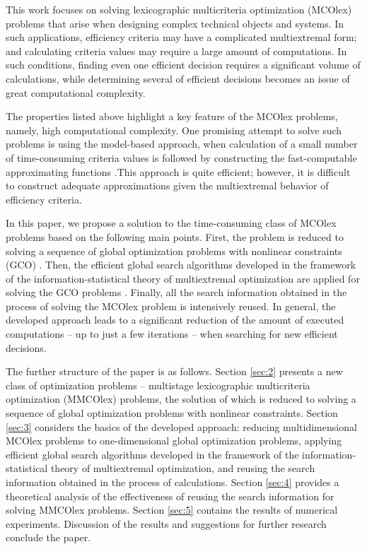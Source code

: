 \documentclass[smallextended]{svjour3}       %
\begin{document}
This work focuses on solving lexicographic multicriteria optimization (MCOlex) problems that arise when designing complex technical objects and systems. In such applications, efficiency criteria may have a complicated multiextremal form; and calculating criteria values may require a large amount of computations. In such conditions, finding even one efficient decision requires a significant volume of calculations, while determining several  of efficient decisions becomes an issue of great computational complexity.

The properties listed above highlight a key feature of the MCOlex problems, namely, high computational complexity. One promising attempt to solve such problems is using the model-based approach, when calculation of a small number of time-consuming criteria values is followed by constructing the fast-computable approximating functions \cite{c15,c16}.This approach is quite efficient; however, it is difficult to construct adequate approximations given the multiextremal behavior of efficiency criteria.

In this paper, we propose a solution to the time-consuming class of MCOlex problems based on the following main points. First, the problem is reduced to solving a sequence of global optimization problems with nonlinear constraints (GCO) \cite{c2,c14}. Then, the efficient global search algorithms developed in the framework of the information-statistical theory of multiextremal optimization are applied for solving the GCO problems \cite{c17,c18}. Finally, all the search information obtained in the process of solving the MCOlex problem is intensively reused. In general, the developed approach leads to a significant reduction of the amount of executed computations -- up to just a few iterations -- when searching for new efficient decisions.

The further structure of the paper is as follows. Section \ref{sec:2} presents a new class of optimization problems -- multistage lexicographic multicriteria optimization (MMCOlex) problems, the solution of which is reduced to solving a sequence of global optimization problems with nonlinear constraints. Section \ref{sec:3} considers the basics of the developed approach: reducing multidimensional MCOlex problems to one-dimensional global optimization problems, applying efficient global search algorithms developed in the framework of the information-statistical theory of multiextremal optimization, and reusing the search information obtained in the process of calculations. Section \ref{sec:4} provides a theoretical analysis of the effectiveness of reusing the search information for solving MMCOlex problems. Section \ref{sec:5} contains the results of numerical experiments. Discussion of the results and suggestions for further research conclude the paper.
\end{document}

